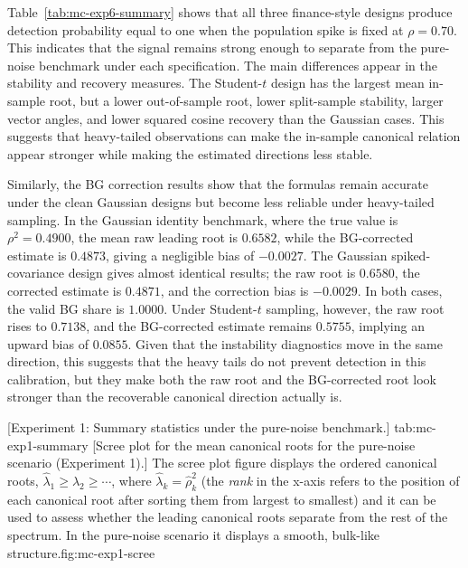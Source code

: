 \documentclass[12pt]{report} %
\newcommand{\setresultnumbering}[1]{%
    \renewcommand{\thefigure}{#1.\arabic{figure}}%
    \renewcommand{\thetable}{#1.\arabic{table}}%
}
\newcommand{\resetresultnumbering}[1]{%
    \setcounter{figure}{0}%
    \setcounter{table}{0}%
    \setresultnumbering{#1}%
}
\begin{document}
Table~\ref{tab:mc-exp6-summary} shows that all three finance-style designs produce detection 
probability equal to one when the population spike is fixed at \(\rho=0.70\). 
This indicates that the signal remains strong enough to separate from the pure-noise benchmark 
under each specification. The main differences appear in the stability and recovery measures. 
The Student-\(t\) design has the largest mean in-sample root, but a lower out-of-sample root, 
lower split-sample stability, larger vector angles, and lower squared cosine recovery than the 
Gaussian cases. This suggests that heavy-tailed observations can make the in-sample canonical 
relation appear stronger while making the estimated directions less stable.

Similarly, the BG correction results show that the formulas remain accurate under the clean 
Gaussian designs but become less reliable under heavy-tailed sampling. In the Gaussian 
identity benchmark, where the true value is \(\rho^2=0.4900\), the mean raw leading root 
is \(0.6582\), while the BG-corrected estimate is \(0.4873\), giving a 
negligible bias of \(-0.0027\). The Gaussian spiked-covariance design gives almost 
identical results; the raw root is \(0.6580\), the corrected estimate is \(0.4871\), 
and the correction bias is \(-0.0029\). In both cases, the valid BG share is \(1.0000\). 
Under Student-\(t\) sampling, however, the raw root rises to \(0.7138\), and the 
BG-corrected estimate remains \(0.5755\), implying an upward bias of \(0.0855\). 
Given that the instability diagnostics move in the same direction, this suggests that the
heavy tails do not prevent detection in this calibration, but they make both the raw root 
and the BG-corrected root look stronger than the recoverable canonical direction actually is.

\clearpage 
\resetresultnumbering{A}

[Experiment 1: Summary statistics under 
the pure-noise benchmark.]{ }{tab:mc-exp1-summary}
[Scree plot for the mean canonical roots for the pure-noise 
scenario (Experiment 1).]{ The scree plot figure displays the ordered canonical roots, 
\(\widehat{\lambda}_1 \geq \widehat{\lambda}_2 \geq \cdots\), where \(\widehat{\lambda}_k=\widehat{\rho}_k^2\) 
(the \emph{rank} in the x-axis refers to the position of each canonical root after sorting 
them from largest to smallest) and it can be used to assess whether the leading canonical 
roots separate from the rest of the spectrum. In the pure-noise scenario it displays a smooth, 
bulk-like structure.}{fig:mc-exp1-scree}
\end{document}
